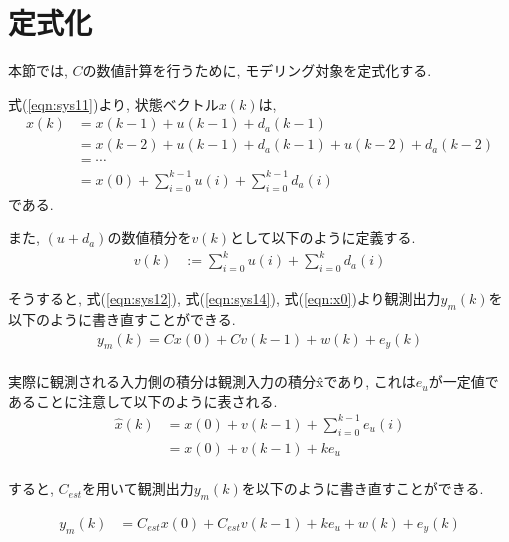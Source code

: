 \documentclass[a4paper,12pt]{jbook}
\begin{document}
\section{定式化}

本節では, $C$の数値計算を行うために, モデリング対象を定式化する.

式(\ref{eqn:sys11})より, 状態ベクトル$x(k)$は, \\
\begin{align}
x(k) &= x(k-1) + u(k-1) + d_a(k-1)\\
&= x(k-2) + u(k-1) + d_a(k-1) + u(k-2) + d_a(k-2)\\
&= \cdots \\
&= x(0) + \sum_{i=0}^{k-1} u(i) + \sum_{i=0}^{k-1} d_a(i)\label{eqn:x0}
\end{align}
である.

また, $(u + d_a)$の数値積分を$v(k)$として以下のように定義する.\\
\begin{align}
v(k) &:= \sum_{i=0}^{k} u(i) + \sum_{i=0}^{k} d_a(i)\label{eqn:v0}
\end{align}

そうすると, 式(\ref{eqn:sys12}), 式(\ref{eqn:sys14}), 式(\ref{eqn:x0})より観測出力$y_m(k)$を以下のように書き直すことができる.\\
\begin{align}
 y_m(k) = C x(0) + C v(k-1) + w(k) + e_y(k) \label{eqn:ym0}
\end{align}\\

実際に観測される入力側の積分は観測入力の積分\^xであり, これは$e_u$が一定値であることに注意して以下のように表される.\\
\begin{align}
\hat{x}(k) &= x(0) + v(k-1) + \sum_{i=0}^{k-1} e_u(i) \\
&= x(0) + v(k-1) + ke_u \label{eqn:xtil0}
\end{align}\\

すると, $C_{est}$を用いて観測出力$y_m(k)$を以下のように書き直すことができる.

\begin{align}
y_m(k) &= C_{est} x(0) + C_{est} v(k-1) + ke_u + w(k) + e_y(k) \label{eqn:ym1}
\end{align}\\

\end{document}
